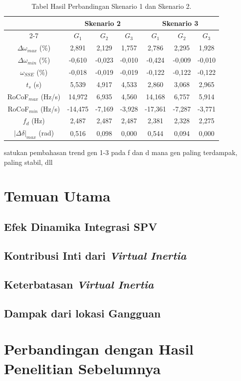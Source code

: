 \begin{table}[ht]
	\caption{Tabel Hasil Perbandingan Skenario 1 dan Skenario 2.}
	\vspace{0.5em}
	\centering
	\begin{tabular}{|c|c|c|c|c|c|c|}
        \hline
        & \multicolumn{3}{c|}{Skenario 2}
        & \multicolumn{3}{c|}{Skenario 3} \\
        \cline{2-7}
        & $G_1$ & $G_2$ & $G_3$ & $G_1$ & $G_2$ & $G_3$ \\
        \hline
        $\Delta\omega_{max}$ (\%) & 
        2,891 & 2,129 & 1,757 & 2,786 & 2,295 & 1,928 \\
        $\Delta\omega_{min}$ (\%) & 
        -0,610 & -0,023 & -0,010 & -0,424 & -0,009 & -0,010 \\
        $\omega_{SSE}$ (\%) & 
        -0,018 & -0,019 & -0,019 & -0,122 & -0,122 & -0,122 \\
        $t_s$ (s) & 
        5,539 & 4,917 & 4,533 & 2,860 & 3,068 & 2,965 \\
        RoCoF$_{max}$ (Hz/s) & 
        14,972 & 6,935 & 4,560 & 14,168 & 6,757 & 5,914 \\
        RoCoF$_{min}$ (Hz/s) & 
        -14,475 & -7,169 & -3,928 & -17,361 & -7,287 & -3,771 \\
        $f_d$ (Hz) & 
        2,487 & 2,487 & 2,487 & 2,381 & 2,328 & 2,275 \\
        $|\Delta\delta|_{max}$ (rad) & 
        0,516 & 0,098 & 0,000 & 0,544 & 0,094 & 0,000 \\
        \hline
	\end{tabular}
	\label{Tab: tabel hasil 23}
\end{table}

satukan pembahasan trend gen 1-3 pada f dan d
mana gen paling terdampak, paling stabil, dll




\section{Temuan Utama}



\subsection{Efek Dinamika Integrasi SPV}



\subsection{Kontribusi Inti dari \textit{Virtual Inertia}}



\subsection{Keterbatasan \textit{Virtual Inertia}}



\subsection{Dampak dari lokasi Gangguan}




\section{Perbandingan dengan Hasil Penelitian Sebelumnya}